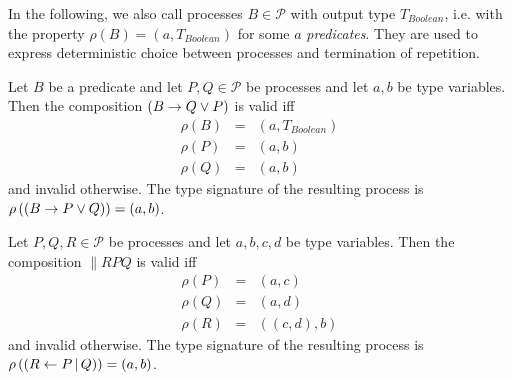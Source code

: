 
In the following, we also call processes $B \in \mathcal{P}$ with output type $T_{Boolean}$, i.e. with the property $\rho \left( B \right) = \left( a, T_{Boolean} \right)$ for some $a$ \textit{predicates}. They are used to express deterministic choice between processes and termination of repetition.

\begin{definition}
\label{def:static_choice}
Let $B$ be a predicate and let $P, Q \in \mathcal{P}$ be processes and let $a, b$ be type variables. Then the composition $\left( B \to Q \vee P \right)$ is valid iff
\begin{eqnarray*}
  \rho \left( B \right) & = & \left( a, T_{Boolean} \right) \\
  \rho \left( P \right) & = & \left( a, b \right) \\
  \rho \left( Q \right) & = & \left( a, b \right)
\end{eqnarray*}
and invalid otherwise. The type signature of the resulting process is $\rho \left( \left( B \to P \vee Q \right) \right) = \left( a, b \right)$.

\hfill\qedsymbol
\end{definition}


\begin{definition}
\label{def:static_parallel}
Let $P, Q, R \in \mathcal{P}$ be processes and let $a, b, c, d$ be type variables. Then the composition $\parallel{R}{P}{Q}$ is valid iff
\begin{eqnarray*}
  \rho \left( P \right) & = & \left( a, c \right) \\
  \rho \left( Q \right) & = & \left( a, d \right) \\
  \rho \left( R \right) & = & \left( \left( c, d \right), b \right)
\end{eqnarray*}
and invalid otherwise. The type signature of the resulting process is $\rho \left( \left( R \gets P \, | \, Q \right) \right) = \left( a, b \right)$.

\hfill\qedsymbol
\end{definition}


